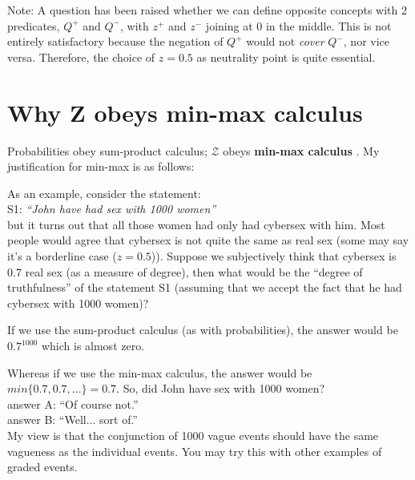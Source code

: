 Note:  A question has been raised whether we can define opposite concepts with 2 predicates, $Q^+$ and $Q^-$, with $z^+$ and $z^-$ joining at 0 in the middle.  This is not entirely satisfactory because the negation of $Q^+$ would not \textit{cover} $Q^-$, nor vice versa.  Therefore, the choice of $z=0.5$ as neutrality point is quite essential.

\section{Why Z obeys min-max calculus}
\label{sec:min-max-VS-sum-product}

Probabilities obey sum-product calculus;  $\mathcal{Z}$ obeys \textbf{min-max calculus} \citep*{Zadeh1965}.  My justification for min-max is as follows:

As an example, consider the statement:\\
\hspace*{1cm} S1: \textit{``John have had sex with 1000 women''}\\
but it turns out that all those women had only had cybersex with him.  Most people would agree that cybersex is not quite the same as real sex (some may say it's a borderline case ($z=0.5$)).  Suppose we subjectively think that cybersex is 0.7 real sex (as a measure of degree), then what would be the ``degree of truthfulness'' of the statement S1 (assuming that we accept the fact that he had cybersex with 1000 women)?

If we use the sum-product calculus (as with probabilities), the answer would be $ 0.7^{1000} $ which is almost zero.

Whereas if we use the min-max calculus, the answer would be $min\{0.7, 0.7, ...\} = 0.7$.  So, did John have sex with 1000 women?\\
\hspace*{1cm} answer A:  ``Of course not.''\\
\hspace*{1cm} answer B:  ``Well... sort of.''\\
My view is that the conjunction of 1000 vague events should have the same vagueness as the individual events.  You may try this with other examples of graded events.


